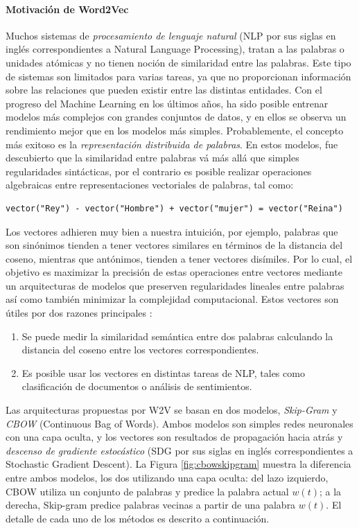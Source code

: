 \paragraph{Motivación de Word2Vec}
Muchos sistemas de \textit{procesamiento de lenguaje natural} (NLP por sus siglas en inglés correspondientes a Natural Language Processing), tratan a las palabras o unidades atómicas y no tienen noción de similaridad entre las palabras. Este tipo de sistemas son limitados para varias tareas, ya que no proporcionan información sobre las relaciones que pueden existir entre las distintas entidades. Con el progreso del Machine Learning en los últimos años, ha sido posible entrenar modelos más complejos con grandes conjuntos de datos, y en ellos se observa un rendimiento mejor que en los modelos más simples. Probablemente, el concepto más exitoso es la \textit{representación distribuida de palabras}. En estos modelos, fue descubierto que la similaridad entre palabras vá más allá que simples regularidades sintácticas, por el contrario es posible realizar operaciones algebraicas entre representaciones vectoriales de palabras, tal como:

\begin{verbatim}
vector("Rey") - vector("Hombre") + vector("mujer") = vector("Reina")
\end{verbatim}

Los vectores adhieren muy bien a nuestra intuición, por ejemplo, palabras que son sinónimos tienden a tener vectores similares en términos de la distancia del coseno, mientras que antónimos, tienden a tener vectores disímiles. Por lo cual, el objetivo es maximizar la precisión de estas operaciones entre vectores mediante un arquitecturas de modelos que preserven regularidades lineales entre palabras así como también minimizar la complejidad computacional. Estos vectores son útiles por dos razones principales \citep{mccormick2016word2vec}:

\begin{enumerate}
	\item Se puede medir la similaridad semántica entre dos palabras calculando la distancia del coseno entre los vectores correspondientes.
	\item Es posible usar los vectores en distintas tareas de NLP, tales como clasificación de documentos o análisis de sentimientos.
\end{enumerate}

\bigskip Las arquitecturas propuestas por W2V se basan en dos modelos, \textit{Skip-Gram} y \textit{CBOW} (Continuous Bag of Words). Ambos modelos son simples redes neuronales con una capa oculta, y los vectores son resultados de propagación hacia atrás y \textit{descenso de gradiente estocástico} (SDG por sus siglas en inglés correspondientes a Stochastic Gradient Descent). La Figura \ref{fig:cbowskipgram} muestra la diferencia entre ambos modelos, los dos utilizando una capa oculta: del lazo izquierdo, CBOW utiliza un conjunto de palabras y predice la palabra actual \(w(t)\); a la derecha, Skip-gram predice palabras vecinas a partir de una palabra \(w(t)\). El detalle de cada uno de los métodos es descrito a continuación.

